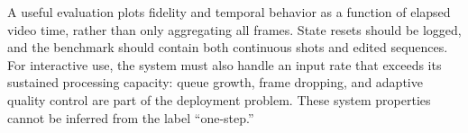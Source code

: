 A useful evaluation plots fidelity and temporal behavior as a function of elapsed video time, rather than only aggregating all frames. State resets should be logged, and the benchmark should contain both continuous shots and edited sequences. For interactive use, the system must also handle an input rate that exceeds its sustained processing capacity: queue growth, frame dropping, and adaptive quality control are part of the deployment problem. These system properties cannot be inferred from the label ``one-step.''
